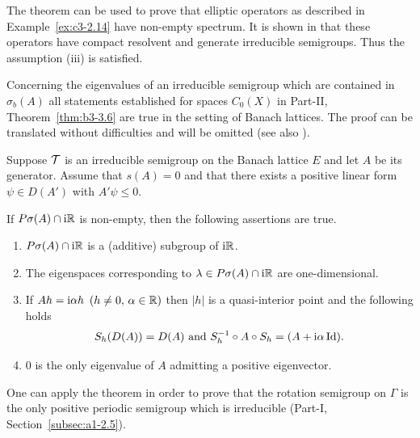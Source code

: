 The theorem can be used to prove that elliptic operators as described in Example~\ref{ex:c3-2.14} have non-empty spectrum.
It is shown in \textcite{amann:1983} that these operators have compact resolvent and generate irreducible semigroups.
Thus the assumption (iii) is satisfied.

Concerning the eigenvalues of an irreducible semigroup which are contained in $\sigma_{b}(A)$ all statements established for spaces $C_{0}(X)$ in Part-II, Theorem~\ref{thm:b3-3.6} are true in the setting of Banach lattices.
The proof can be translated without difficulties and will be omitted (see also \textcite[Theorem~2.6]{greiner:1982}).
\begin{theorem}\label{thm:c3-3.8}
	Suppose $\mathcal{T}$ is an irreducible semigroup
    on the Banach lattice $E$ and let $A$ be its generator.
	Assume that $s(A) = 0$ and that there exists a positive linear form $\psi \in D(A')$ with $A'\psi \leq 0$. 

    If\/ $P\sigma(A)\cap \mathrm{i}\mathbb{R} $ is non-empty, then the following assertions are true.
	\begin{enumerate}[\upshape (i)]
		\item 
			$P\sigma(A)\cap \mathrm{i}\mathbb{R} $ is a (additive) subgroup of\/ $\mathrm{i}\mathbb{R} $.
	
		\item 
		The eigenspaces corresponding to $\lambda \in P\sigma(A)\cap \mathrm{i}\mathbb{R} $ are one-dimensional.
	
		\item 
		If\/ $Ah = \mathrm{i}\alpha h$ $(h \neq 0,\, \alpha \in \mathbb{R} )$ then $|h|$ is a quasi-interior point and the following holds
		\begin{equation}\label{eq:c3-3.13}
			S_{h}(D(A)) = D(A) \text{ and } S_{h}^{-1}\circ A\circ S_{h} = (A + \mathrm{i}\alpha\operatorname{Id}).
		\end{equation}
		
		\item 
		$0$ is the only eigenvalue of\/ $A$ admitting a positive eigenvector.
	\end{enumerate}
\end{theorem}
One can apply the theorem in order to prove that the rotation semigroup on $\Gamma$ 
 is the only positive periodic semigroup
which is irreducible (\cf Part-I, Section~\ref{subsec:a1-2.5}).%
%
%
